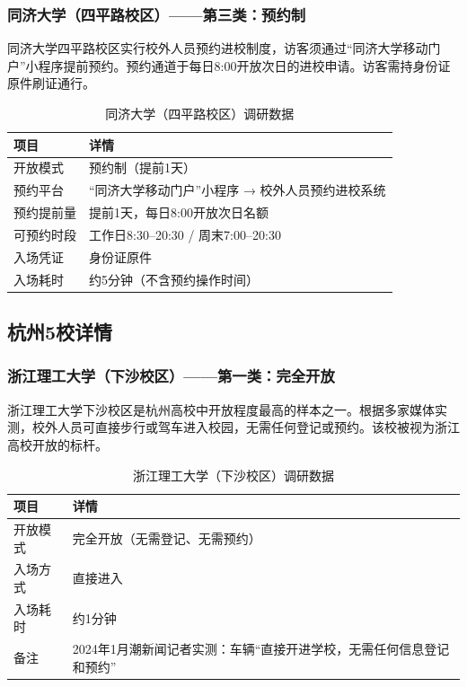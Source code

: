 \documentclass[12pt]{article}
\begin{document}
\subsubsection{同济大学（四平路校区）——第三类：预约制}

同济大学四平路校区实行校外人员预约进校制度，访客须通过“同济大学移动门户”小程序提前预约。预约通道于每日8:00开放次日的进校申请。访客需持身份证原件刷证通行。

\begin{table}[H]
\centering
\caption{同济大学（四平路校区）调研数据}
\label{tab:tj}
\begin{tabular}{p{3cm}p{7.5cm}}
\toprule
\textbf{项目} & \textbf{详情} \\
\midrule
开放模式 & 预约制（提前1天） \\
预约平台 & “同济大学移动门户”小程序 → 校外人员预约进校系统 \\
预约提前量 & 提前1天，每日8:00开放次日名额 \\
可预约时段 & 工作日8:30–20:30 / 周末7:00–20:30 \\
入场凭证 & 身份证原件 \\
入场耗时 & 约5分钟（不含预约操作时间） \\
\bottomrule
\end{tabular}
\end{table}

\subsection{杭州5校详情}

\subsubsection{浙江理工大学（下沙校区）——第一类：完全开放}

浙江理工大学下沙校区是杭州高校中开放程度最高的样本之一。根据多家媒体实测，校外人员可直接步行或驾车进入校园，无需任何登记或预约。该校被视为浙江高校开放的标杆。

\begin{table}[H]
\centering
\caption{浙江理工大学（下沙校区）调研数据}
\label{tab:zstu}
\begin{tabular}{p{3cm}p{7.5cm}}
\toprule
\textbf{项目} & \textbf{详情} \\
\midrule
开放模式 & 完全开放（无需登记、无需预约） \\
入场方式 & 直接进入 \\
入场耗时 & 约1分钟 \\
备注 & 2024年1月潮新闻记者实测：车辆“直接开进学校，无需任何信息登记和预约” \\
\bottomrule
\end{tabular}
\end{table}
\end{document}
